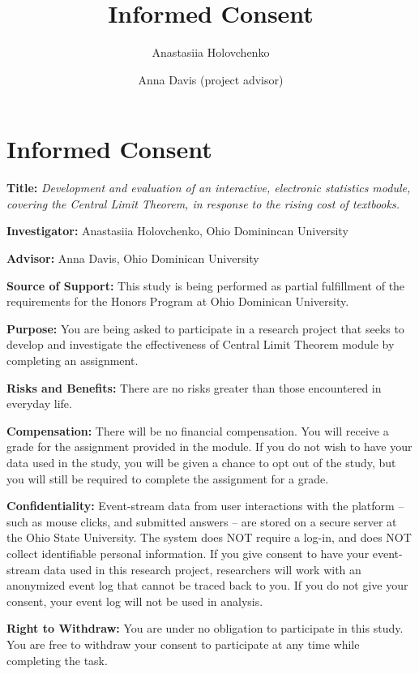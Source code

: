 \documentclass{ximera}
\author{Anastasiia Holovchenko \and Anna Davis (project advisor)} \title{Informed Consent}
\begin{document}
\begin{abstract}
\end{abstract}
\maketitle 

\section{Informed Consent}

\textbf{Title:} \emph{Development and evaluation of an interactive, electronic statistics module, covering the Central Limit Theorem, in response to the rising cost of textbooks.}

\textbf{Investigator:} Anastasiia Holovchenko, Ohio Dominincan University

\textbf{Advisor:} Anna Davis, Ohio Dominican University

\textbf{Source of Support:} This study is being performed as partial fulfillment of the requirements for the Honors Program at Ohio Dominican University.

\textbf{Purpose:} You are being asked to participate in a research project that seeks to develop and investigate the effectiveness of Central Limit Theorem module by completing an assignment.

\textbf{Risks and Benefits:} There are no risks greater than those encountered in everyday life.

\textbf{Compensation:} There will be no financial compensation. You will receive a grade for the assignment provided in the module. If you do not wish to have your data used in the study, you will be given a chance to opt out of the study, but you will still be required to complete the assignment for a grade.

\textbf{Confidentiality:} Event-stream data from user interactions with the platform -- such as mouse clicks, and submitted answers -- are stored on a secure server at the Ohio State University.  The system does NOT require a log-in, and does NOT collect identifiable personal information.  If you give consent to have your event-stream data used in this research project, researchers will work with an anonymized event log that cannot be traced back to you. If you do not give your consent, your event log will not be used in analysis.  

\textbf{Right to Withdraw:} You are under no obligation to participate in this study.  You are free to withdraw your consent to participate at any time while completing the task. 
\end{document}
